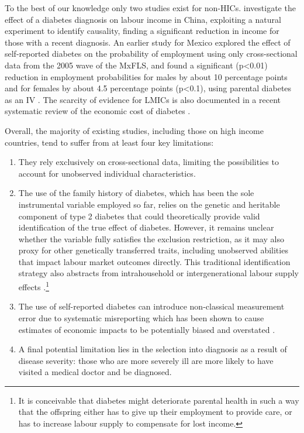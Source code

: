 To the best of our knowledge only two studies exist for non-\acp{HIC}. \textcite{Liu2014} investigate the effect of a diabetes diagnosis on labour income in China, exploiting a natural experiment to identify causality, finding a significant reduction in income for those with a recent diagnosis. An earlier study for Mexico explored the effect of self-reported diabetes on the probability of employment using only cross-sectional data from the 2005 wave of the \ac{MxFLS}, and found a significant (p<0.01) reduction in employment probabilities for males by about 10 percentage points and for females by about 4.5  percentage points (p<0.1), using parental diabetes as an \ac{IV} \parencite{Seuring2015}. The scarcity of evidence for \acp{LMIC} is also documented in a recent systematic review of the economic cost of diabetes \parencite{Seuring2015a}. 


Overall, the majority of existing studies, including those on high income countries, tend to suffer from at least four key limitations: 
\begin{enumerate}
\item  They rely exclusively on cross-sectional data, limiting the possibilities to account for unobserved individual characteristics.
\item The use of the family history of diabetes, which has been the sole instrumental variable employed so far, relies on the genetic and heritable component of type 2 diabetes that could theoretically provide valid identification of the true effect of diabetes. However, it remains unclear whether the variable fully satisfies the exclusion restriction, as it may also proxy for other genetically transferred traits, including unobserved abilities that impact labour market outcomes directly. This traditional identification strategy also abstracts from intrahousehold or intergenerational labour supply effects \parencite{Seuring2015}.\footnote{It is conceivable that diabetes might deteriorate parental health in such a way that the offspring either has to give up their employment to provide care, or has to increase labour supply to compensate for lost income.}
\item The use of self-reported diabetes can introduce non-classical measurement error due to systematic misreporting which has been shown to cause estimates of economic impacts to be potentially biased and overstated \parencite{Cawley2015,ONeill2013,Perks2015}.
\item A final potential limitation lies in the selection into diagnosis as a result of disease severity: those who are more severely ill are more likely to have visited a medical doctor and be diagnosed.  
\end{enumerate}

